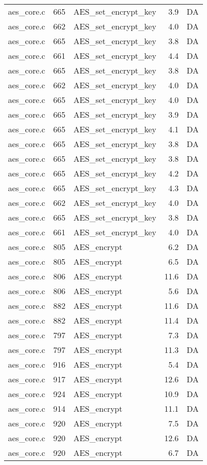 \begin{table}[h!]
\begin{tabular}{lrlrr}
aes\_core.c& 665&AES\_set\_encrypt\_key&3.9 &DA\\
aes\_core.c& 662&AES\_set\_encrypt\_key&4.0 &DA\\
aes\_core.c& 665&AES\_set\_encrypt\_key&3.8 &DA\\
aes\_core.c& 661&AES\_set\_encrypt\_key&4.4 &DA\\
aes\_core.c& 665&AES\_set\_encrypt\_key&3.8 &DA\\
aes\_core.c& 662&AES\_set\_encrypt\_key&4.0 &DA\\
aes\_core.c& 665&AES\_set\_encrypt\_key&4.0 &DA\\
aes\_core.c& 665&AES\_set\_encrypt\_key&3.9 &DA\\
aes\_core.c& 665&AES\_set\_encrypt\_key&4.1 &DA\\
aes\_core.c& 665&AES\_set\_encrypt\_key&3.8 &DA\\
aes\_core.c& 665&AES\_set\_encrypt\_key&3.8 &DA\\
aes\_core.c& 665&AES\_set\_encrypt\_key&4.2 &DA\\
aes\_core.c& 665&AES\_set\_encrypt\_key&4.3 &DA\\
aes\_core.c& 662&AES\_set\_encrypt\_key&4.0 &DA\\
aes\_core.c& 665&AES\_set\_encrypt\_key&3.8 &DA\\
aes\_core.c& 661&AES\_set\_encrypt\_key&4.0 &DA\\
aes\_core.c& 805&AES\_encrypt&6.2 &DA\\
aes\_core.c& 805&AES\_encrypt&6.5 &DA\\
aes\_core.c& 806&AES\_encrypt&11.6 &DA\\
aes\_core.c& 806&AES\_encrypt&5.6 &DA\\
aes\_core.c& 882&AES\_encrypt&11.6 &DA\\
aes\_core.c& 882&AES\_encrypt&11.4 &DA\\
aes\_core.c& 797&AES\_encrypt&7.3 &DA\\
aes\_core.c& 797&AES\_encrypt&11.3 &DA\\
aes\_core.c& 916&AES\_encrypt&5.4 &DA\\
aes\_core.c& 917&AES\_encrypt&12.6 &DA\\
aes\_core.c& 924&AES\_encrypt&10.9 &DA\\
aes\_core.c& 914&AES\_encrypt&11.1 &DA\\
aes\_core.c& 920&AES\_encrypt&7.5 &DA\\
aes\_core.c& 920&AES\_encrypt&12.6 &DA\\
aes\_core.c& 920&AES\_encrypt&6.7 &DA\\

\end{tabular}
\end{table}
